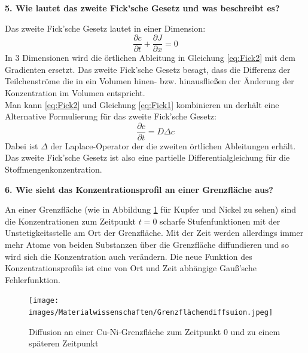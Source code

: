 \noindent\textbf{5. Wie lautet das zweite Fick'sche Gesetz und was beschreibt es?}\\
\begin{addmargin}[25pt]{0pt}
Das zweite Fick'sche Gesetz lautet in einer Dimension:
\begin{equation}\label{eq:Fick2}
    \frac{\partial c}{\partial t} + \frac{\partial J}{\partial x} = 0
\end{equation}
In 3 Dimensionen wird die örtlichen Ableitung in Gleichung \ref{eq:Fick2} mit dem Gradienten ersetzt. Das zweite Fick'sche Gesetz besagt, dass die Differenz der Teilchenströme die in ein Volumen hinen- bzw. hinausfließen der Änderung der Konzentration im Volumen entspricht.\\
Man kann \ref{eq:Fick2} und Gleichung \ref{eq:Fick1} kombinieren un derhält eine Alternative Formulierung für das zweite Fick'sche Gesetz:
\begin{equation}\label{eq:Fick2_Alternative}
    \frac{\partial c}{\partial t} = D \Delta c
\end{equation}
Dabei ist $\Delta$ der Laplace-Operator der die zweiten örtlichen Ableitungen erhält. Das zweite Fick'sche Gesetz ist also eine partielle Differentialgleichung für die Stoffmengenkonzentration.\\
\end{addmargin} 

\noindent\textbf{6. Wie sieht das Konzentrationsprofil an einer Grenzfläche aus?}\\
\begin{addmargin}[25pt]{0pt}
An einer Grenzfläche (wie in Abbildung \ref{fig:grenzflächendiffusion} für Kupfer und Nickel zu sehen) sind die Konzentrationen zum Zeitpunkt $t = 0$ scharfe Stufenfunktionen mit der Unstetigkeitsstelle am Ort der Grenzfläche. Mit der Zeit werden allerdings immer mehr Atome von beiden Substanzen über die Grenzfläche diffundieren und so wird sich die Konzentration auch verändern. Die neue Funktion des Konzentrationsprofils ist eine von Ort und Zeit abhängige Gauß'sche Fehlerfunktion. \\

\begin{figure}[h]
    \centering
    \texttt{[image: images/Materialwissenschaften/Grenzflächendiffsuion.jpeg]}
    \caption{Diffusion an einer Cu-Ni-Grenzfläche zum Zeitpunkt 0 und zu einem späteren Zeitpunkt }
    \label{fig:grenzflächendiffusion}
\end{figure}
\end{addmargin} 

